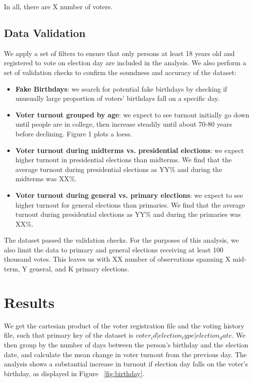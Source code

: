 \documentclass[12pt, letterpaper]{article}
\begin{document}
In all, there are X number of voters. 

\subsection{Data Validation}

We apply a set of filters to ensure that only persons at least 18 years old and registered to vote on election day are included in the analysis. We also perform a set of validation checks to confirm the soundness and accuracy of the dataset: 

\begin{itemize}

	\item \textbf{Fake Birthdays}: we search for potential fake birthdays by checking if unusually large proportion of voters' birthdays fall on a specific day.

	\item \textbf{Voter turnout grouped by age}: we expect to see turnout initially go down until people are in college, then increase steadily until about 70-80 years before declining. Figure 1 plots a loess.  

	\item \textbf{Voter turnout during midterms vs. presidential elections}: we expect higher turnout in presidential elections than midterms. We find that the average turnout during presidential elections as YY\% and during the midterms was XX\%. 

	\item \textbf{Voter turnout during general vs. primary elections}: we expect to see higher turnout for general elections than primaries. We find that the average turnout during presidential elections as YY\% and during the primaries was XX\%. 

\end{itemize}


The dataset passed the validation checks. For the purposes of this analysis, we also limit the data to primary and general elections receiving at least 100 thousand votes. This leaves us with XX number of observations spanning X mid-term, Y general, and K primary elections. 

\section{Results}
We get the cartesian product of the voter registration file and the voting history file, such that primary key of the dataset is $voter_id | election_type | election_date$. We then group by the number of days between the person's birthday and the election date, and calculate the mean change in voter turnout from the previous day. The analysis shows a substantial increase in turnout if election day falls on the voter’s birthday, as displayed in Figure ~\ref{fig:birthday}.
\end{document}
